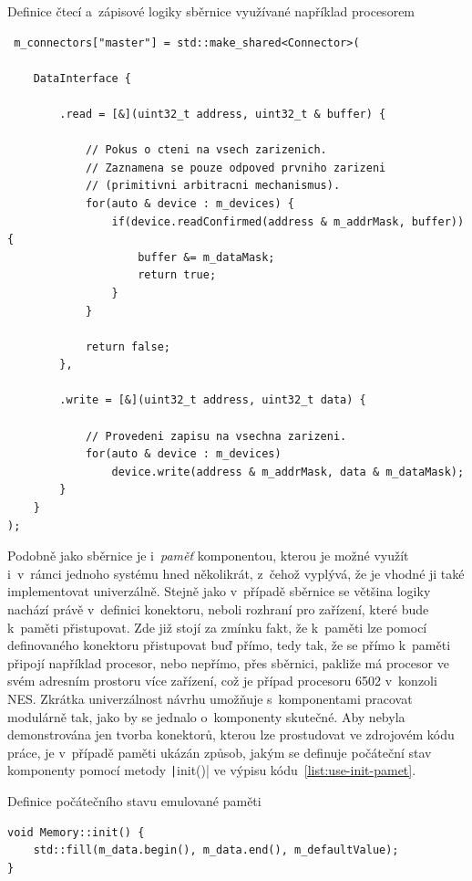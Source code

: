 \begin{listing}
	\caption{Definice čtecí a~zápisové logiky sběrnice využívané například procesorem}
	\label{list:use-sbernice}
	\begin{verbatim}
 m_connectors["master"] = std::make_shared<Connector>(
	
	DataInterface {
	
		.read = [&](uint32_t address, uint32_t & buffer) {
	
			// Pokus o cteni na vsech zarizenich.
			// Zaznamena se pouze odpoved prvniho zarizeni 
			// (primitivni arbitracni mechanismus).
			for(auto & device : m_devices) {
				if(device.readConfirmed(address & m_addrMask, buffer)) {
					buffer &= m_dataMask;
					return true;
				}
			}
			
			return false;
		},
	
		.write = [&](uint32_t address, uint32_t data) {
	
			// Provedeni zapisu na vsechna zarizeni.		
			for(auto & device : m_devices)
				device.write(address & m_addrMask, data & m_dataMask);
		}
	}
);
	\end{verbatim}
\end{listing}

Podobně jako sběrnice je i~\emph{paměť} komponentou, kterou je možné využít i~v~rámci jednoho systému hned několikrát, z~čehož vyplývá, že je vhodné ji také implementovat univerzálně. Stejně jako v~případě sběrnice se většina logiky nachází právě v~definici konektoru, neboli rozhraní pro zařízení, které bude k~paměti přistupovat. Zde již stojí za zmínku fakt, že k~paměti lze pomocí definovaného konektoru přistupovat buď přímo, tedy tak, že se přímo k~paměti připojí například procesor, nebo nepřímo, přes sběrnici, pakliže má procesor ve svém adresním prostoru více zařízení, což je případ procesoru 6502 v~konzoli NES. Zkrátka univerzálnost návrhu umožňuje s~komponentami pracovat modulárně tak, jako by se jednalo o~komponenty skutečné. Aby nebyla demonstrována jen tvorba konektorů, kterou lze prostudovat ve zdrojovém kódu práce, je v~případě paměti ukázán způsob, jakým se definuje počáteční stav komponenty pomocí metody \texttt|init()| ve výpisu kódu~\ref{list:use-init-pamet}.

\begin{listing}
	\caption{Definice počátečního stavu emulované paměti}
	\label{list:use-init-pamet}
	\begin{verbatim}
void Memory::init() {
	std::fill(m_data.begin(), m_data.end(), m_defaultValue);
}
	\end{verbatim}
\end{listing}

